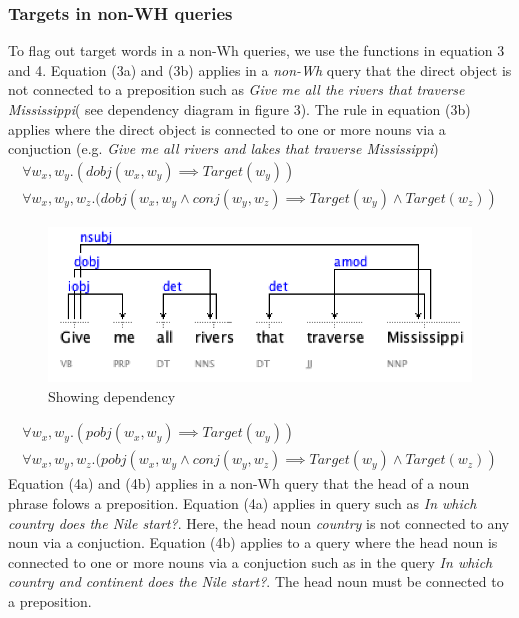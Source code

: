 \documentclass[review]{elsarticle}
\begin{document}
\subsubsection{ Targets in non-WH  queries}
To  flag out target words in a non-Wh queries, we use the functions in equation 3 and 4. Equation (3a) and (3b) applies in a \textit{non-Wh} query that the direct object is not connected to a preposition such as \textit{ Give me all the rivers that traverse Mississippi}( see dependency diagram in figure 3). The rule in equation (3b) applies where the direct object is connected to one or more nouns  via a conjuction (e.g. \textit{Give me all rivers and lakes that traverse Mississippi})
\begin{subequations}
\begin{align}
\forall w_x,w_y.(dobj(w_x,w_y)\implies Target(w_y))\\
\forall   w_x,w_y,w_z.(dobj(w_x,w_y\land conj(w_y,w_z)\implies Target(w_y)\land Target(w_z))
\end{align}
\end{subequations}
\begin{figure}[h]
	\centering
		\includegraphics[scale=0.7,angle=0]{dobj.png}
	\caption{Showing dependency }
	\label{fig:example1}
	\end{figure}
\begin{subequations}
\begin{align}
\forall w_x,w_y.(pobj(w_x,w_y)\implies Target(w_y))\\
\forall   w_x,w_y,w_z.(pobj(w_x,w_y\land conj(w_y,w_z)\implies Target(w_y)\land Target(w_z))
\end{align}
\end{subequations}
Equation (4a) and (4b) applies in a non-Wh query that  the head  of a noun phrase folows a preposition.  Equation (4a) applies in  query such as \textit{In which country does the Nile start?}. Here,  the head noun \textit{country}  is not connected to any noun via a conjuction. Equation (4b) applies to a query where the head noun  is connected to one or more nouns via a conjuction such as in the query \textit{In which country and continent does the Nile start?}. The head  noun must be connected to a preposition.
\end{document}
